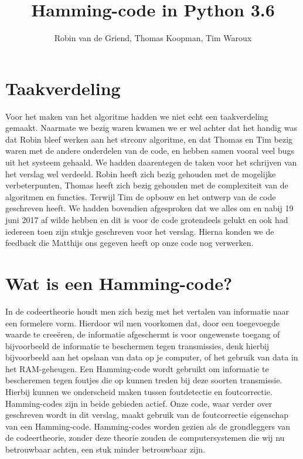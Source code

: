 \documentclass[a4paper]{article}
\begin{document}
\title{Hamming-code in Python 3.6}
\author{Robin van de Griend, Thomas Koopman, Tim Waroux}
\maketitle

\section{Taakverdeling}
Voor het maken van het algoritme hadden we niet echt een taakverdeling gemaakt. Naarmate we bezig waren kwamen we er wel achter dat het handig was dat Robin bleef werken aan het strconv algoritme, en dat Thomas en Tim bezig waren met de andere onderdelen van de code, en hebben samen vooral veel bugs uit het systeem gehaald. We hadden daarentegen de taken voor het schrijven van het verslag wel verdeeld. Robin heeft zich bezig gehouden met de mogelijke verbeterpunten, Thomas heeft zich bezig gehouden met de complexiteit van de algoritmen en functies. Terwijl Tim de opbouw en het ontwerp van de code geschreven heeft. We hadden bovendien afgesproken dat we alles om en nabij 19 juni 2017 af wilde hebben en dit is voor de code grotendeels gelukt en ook had iedereen toen zijn stukje geschreven voor het verslag. Hierna konden we de feedback die Matthijs ons gegeven heeft op onze code nog verwerken.

\section{Wat is een Hamming-code?}
In de codeertheorie houdt men zich bezig met het vertalen van informatie naar een formelere vorm. Hierdoor wil men voorkomen dat, door een toegevoegde waarde te cree\"eren, de informatie afgeschermt is voor ongewenste toegang of bijvoorbeeld de informatie te beschermen tegen transmissies, denk hierbij bijvoorbeeld aan het opslaan van data op je computer, of het gebruik van data in het RAM-geheugen. Een Hamming-code wordt gebruikt om informatie te bescheremen tegen foutjes die op kunnen treden bij deze soorten transmissie. Hierbij kunnen we onderscheid maken tussen foutdetectie en foutcorrectie. Hamming-codes zijn in beide gebieden actief. Onze code, waar verder over geschreven wordt in dit verslag, maakt gebruik van de foutcorrectie eigenschap van een Hamming-code. Hamming-codes worden gezien als de grondleggers van de codeertheorie, zonder deze theorie zouden de computersystemen die wij nu betrouwbaar achten, een stuk minder betrouwbaar zijn.
\end{document}
